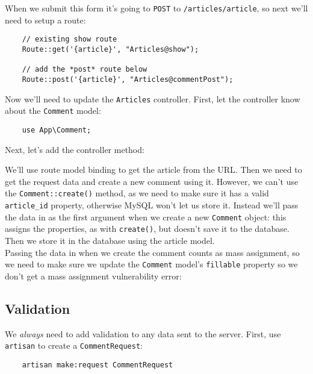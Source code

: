 When we submit this form it's going to \texttt{POST} to \texttt{/articles/{article}}, so next we'll need to setup a route:

\begin{verbatim}
    // existing show route
    Route::get('{article}', "Articles@show");

    // add the *post* route below
    Route::post('{article}', "Articles@commentPost");
\end{verbatim}


Now we'll need to update the \texttt{Articles} controller. First, let the controller know about the \texttt{Comment} model:

\begin{verbatim}
    use App\Comment;
\end{verbatim}

Next, let's add the controller method:


We'll use route model binding to get the article from the URL. Then we need to get the request data and create a new comment using it. However, we can't use the \texttt{Comment::create()} method, as we need to make sure it has a valid \texttt{article\_id} property, otherwise MySQL won't let us store it. Instead we'll pass the data in as the first argument when we create a new \texttt{Comment} object: this assigns the properties, as with \texttt{create()}, but doesn't save it to the database. Then we store it in the database using the article model.
\\

Passing the data in when we create the comment counts as mass assignment, so we need to make sure we update the \texttt{Comment} model's \texttt{fillable} property so we don't get a mass assignment vulnerability error:



\subsection{Validation}

We \textit{always} need to add validation to any data sent to the server. First, use \texttt{artisan} to create a \texttt{CommentRequest}:

\begin{verbatim}
    artisan make:request CommentRequest
\end{verbatim}

